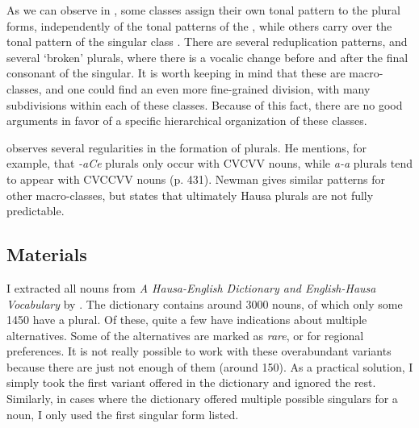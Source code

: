 As we can observe in , some  classes assign their own tonal pattern to the plural forms, independently of the tonal patterns of the , while others carry over the tonal pattern of the singular class \autocite[430]{Newman.2000}. There are several reduplication patterns, and several `broken' plurals, where there is a vocalic change before and after the final consonant of the singular. It is worth keeping in mind that these are macro-classes, and one could find an even more fine-grained division, with many subdivisions within each of these classes. Because of this fact, there are no good arguments in favor of a specific hierarchical organization of these classes.

\textcite[chapter 56]{Newman.2000} observes several regularities in the formation of plurals. He mentions, for example, that \textit{-aCe} plurals only occur with CVCVV nouns, while \textit{a-a} plurals tend to appear with CVCCVV nouns (p. 431). Newman gives similar patterns for other macro-classes, but states that ultimately Hausa plurals are not fully predictable.

\subsection{Materials}

I extracted all nouns from \textit{A Hausa-English Dictionary and English-Hausa Vocabulary} by \textcite{Bargery.1951}. The dictionary contains around 3000 nouns, of which only some 1450 have a plural. Of these, quite a few have indications about multiple alternatives. Some of the alternatives are marked as \textit{rare}, or for regional preferences. It is not really possible to work with these overabundant variants \autocites{Migeod.1914, Salim.1981, Newman.2000} because there are just not enough of them (around 150). As a practical solution, I simply took the first variant offered in the dictionary and ignored the rest.
Similarly, in cases where the dictionary offered multiple possible singulars for a noun, I only used the first singular form listed.


